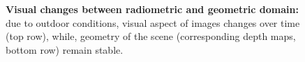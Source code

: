 \begin{figure}
	\caption[Images and depth maps comparison]{\label{fig:image_vs_depth} \textbf{Visual changes between radiometric and geometric domain:} due to outdoor conditions, visual aspect of images changes over time (top row), while, geometry of the scene (corresponding depth maps, bottom row) remain stable.}
	
\end{figure}
	